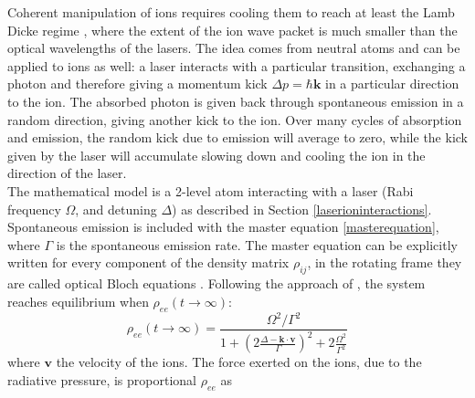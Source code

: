 Coherent manipulation of ions requires cooling them to reach at least the Lamb Dicke regime \cite{Wineland1998}, where the extent of the ion wave packet is much smaller than the optical wavelengths of the lasers. The idea comes from neutral atoms \cite{1975OptCo..13...68H} and can be applied to ions as well: a laser interacts with a particular transition, exchanging a photon and therefore giving a momentum kick $\Delta p = \hbar \mathbf{k}$ in a particular direction to the ion. The absorbed photon is given back through spontaneous emission in a random direction, giving another kick to the ion. Over many cycles of absorption and emission, the random kick due to emission will average to zero, while the kick given by the laser will accumulate slowing down and cooling the ion in the direction of the laser. \\
The mathematical model is a 2-level atom interacting with a laser (Rabi frequency $\Omega$, and detuning $\Delta$) as described in Section \ref{laserioninteractions}. Spontaneous emission is included with the master equation \eqref{masterequation}, where $\Gamma$ is the spontaneous emission rate. The master equation can be explicitly written for every component of the density matrix $\rho_{ij}$, in the rotating frame they are called optical Bloch equations \cite{foot}. Following the approach of \cite{gabriel}, the system reaches equilibrium when $\rho_{ee}(t\to \infty)$:
\begin{equation}
\rho_{ee}(t\to \infty) = \frac{\Omega^2/\Gamma^2}{1 + \left(2\frac{\Delta -\mathbf{k}\cdot \mathbf{v}}{\Gamma}\right)^2 + 2\frac{\Omega^2}{\Gamma^2}}
\end{equation}
where $\mathbf{v}$ the velocity of the ions. The force exerted on the ions, due to the radiative pressure, is proportional $\rho_{ee}$ as
